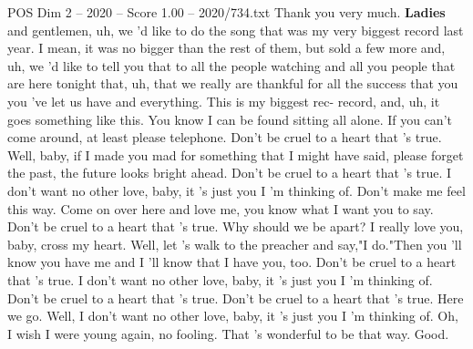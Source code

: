\begin{textsample}{POS Dim 2 – 2020 – Score 1.00 – 2020/734.txt}  \label{ex:f2_pos_024}
Thank you very much. \textbf{Ladies} and gentlemen, uh, we 'd like to do the song that was my very biggest record last year.
I mean, it was no bigger than the rest of them, but sold a few more and, uh, we 'd like to tell you that to all the people watching and all you people that are here tonight that, uh, that we really are thankful for all the success that you you 've let us have and everything.
This is my biggest rec- record, and, uh, it goes something like this.
You know I can be found sitting all alone.
If you can't come around, at least please telephone.
Don't be cruel to a heart that 's true.
Well, baby, if I made you mad for something that I might have said, please forget the past, the future looks bright ahead.
Don't be cruel to a heart that 's true.
I don't want no other love, baby, it 's just you I 'm thinking of.
Don't make me feel this way.
Come on over here and love me, you know what I want you to say.
Don't be cruel to a heart that 's true.
Why should we be apart?
I really love you, baby, cross my heart.
Well, let 's walk to the preacher and say,"I do."Then you 'll know you have me and I 'll know that I have you, too.
Don't be cruel to a heart that 's true.
I don't want no other love, baby, it 's just you I 'm thinking of.
Don't be cruel to a heart that 's true.
Don't be cruel to a heart that 's true.
Here we go.
Well, I don't want no other love, baby, it 's just you I 'm thinking of.
Oh, I wish I were young again, no fooling.
That 's wonderful to be that way.
Good.

\end{textsample}
